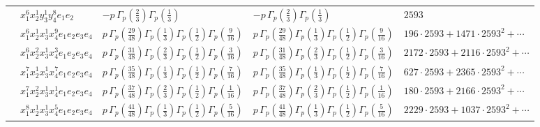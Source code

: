\documentclass[11pt]{article}
\begin{document}
\begin{table}[ht]
{\begin{tabular}{@{}lllll@{}}
 & $x_{1}^{6} x_{2}^{1} y_{3}^{1} y_{4}^{8} e_{1} e_{2}$ & $- p \, \Gamma_p \left( \frac{2}{3} \right) \Gamma_p \left( \frac{1}{3} \right)$ & $- p \, \Gamma_p \left( \frac{2}{3} \right) \Gamma_p \left( \frac{1}{3} \right)$ & $2593$ \\
 & $x_{1}^{6} x_{2}^{1} x_{3}^{1} x_{4}^{9}  e_{1} e_{2} e_{3} e_{4}$ & $p \, \Gamma_p \left( \frac{29}{48} \right) \Gamma_p \left( \frac{1}{3} \right) \Gamma_p \left( \frac{1}{2} \right) \Gamma_p \left( \frac{9}{16} \right)$ & $p \, \Gamma_p \left( \frac{29}{48} \right) \Gamma_p \left( \frac{1}{3} \right) \Gamma_p \left( \frac{1}{2} \right) \Gamma_p \left( \frac{9}{16} \right)$ & $196{\cdot}2593{+}1471{\cdot}2593^{2}{+}\cdots$ \\
 & $x_{1}^{6} x_{2}^{2} x_{3}^{1} x_{4}^{3}  e_{1} e_{2} e_{3} e_{4}$ & $p \, \Gamma_p \left( \frac{31}{48} \right) \Gamma_p \left( \frac{2}{3} \right) \Gamma_p \left( \frac{1}{2} \right) \Gamma_p \left( \frac{3}{16} \right)$ & $p \, \Gamma_p \left( \frac{31}{48} \right) \Gamma_p \left( \frac{2}{3} \right) \Gamma_p \left( \frac{1}{2} \right) \Gamma_p \left( \frac{3}{16} \right)$ & $2172{\cdot}2593{+}2116{\cdot}2593^{2}{+}\cdots$ \\
 & $x_{1}^{7} x_{2}^{1} x_{3}^{1} x_{4}^{7}  e_{1} e_{2} e_{3} e_{4}$ & $p \, \Gamma_p \left( \frac{35}{48} \right) \Gamma_p \left( \frac{1}{3} \right) \Gamma_p \left( \frac{1}{2} \right) \Gamma_p \left( \frac{7}{16} \right)$ & $p \, \Gamma_p \left( \frac{35}{48} \right) \Gamma_p \left( \frac{1}{3} \right) \Gamma_p \left( \frac{1}{2} \right) \Gamma_p \left( \frac{7}{16} \right)$ & $627{\cdot}2593{+}2365{\cdot}2593^{2}{+}\cdots$ \\
 & $x_{1}^{7} x_{2}^{2} x_{3}^{1} x_{4}^{1}  e_{1} e_{2} e_{3} e_{4}$ & $p \, \Gamma_p \left( \frac{37}{48} \right) \Gamma_p \left( \frac{2}{3} \right) \Gamma_p \left( \frac{1}{2} \right) \Gamma_p \left( \frac{1}{16} \right)$ & $p \, \Gamma_p \left( \frac{37}{48} \right) \Gamma_p \left( \frac{2}{3} \right) \Gamma_p \left( \frac{1}{2} \right) \Gamma_p \left( \frac{1}{16} \right)$ & $180{\cdot}2593{+}2166{\cdot}2593^{2}{+}\cdots$ \\
 & $x_{1}^{8} x_{2}^{1} x_{3}^{1} x_{4}^{5}  e_{1} e_{2} e_{3} e_{4}$ & $p \, \Gamma_p \left( \frac{41}{48} \right) \Gamma_p \left( \frac{1}{3} \right) \Gamma_p \left( \frac{1}{2} \right) \Gamma_p \left( \frac{5}{16} \right)$ & $p \, \Gamma_p \left( \frac{41}{48} \right) \Gamma_p \left( \frac{1}{3} \right) \Gamma_p \left( \frac{1}{2} \right) \Gamma_p \left( \frac{5}{16} \right)$ & $2229{\cdot}2593{+}1037{\cdot}2593^{2}{+}\cdots$ \\

\end{tabular}}
\end{table}
\end{document}
